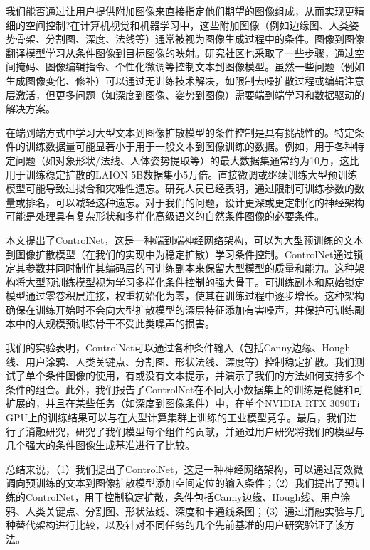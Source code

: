 \documentclass[a4paper,AutoFakeBold,oneside,12pt]{book}
\begin{document}
\begin{nopagenumber}
我们能否通过让用户提供附加图像来直接指定他们期望的图像组成，从而实现更精细的空间控制?在计算机视觉和机器学习中，这些附加图像（例如边缘图、人类姿势骨架、分割图、深度、法线等）通常被视为图像生成过程中的条件。图像到图像翻译模型学习从条件图像到目标图像的映射。研究社区也采取了一些步骤，通过空间掩码、图像编辑指令、个性化微调等控制文本到图像模型。虽然一些问题（例如生成图像变化、修补）可以通过无训练技术解决，如限制去噪扩散过程或编辑注意层激活，但更多问题（如深度到图像、姿势到图像）需要端到端学习和数据驱动的解决方案。

在端到端方式中学习大型文本到图像扩散模型的条件控制是具有挑战性的。特定条件的训练数据量可能显著小于用于一般文本到图像训练的数据。例如，用于各种特定问题（如对象形状/法线、人体姿势提取等）的最大数据集通常约为10万，这比用于训练稳定扩散的LAION-5B数据集小5万倍。直接微调或继续训练大型预训练模型可能导致过拟合和灾难性遗忘。研究人员已经表明，通过限制可训练参数的数量或排名，可以减轻这种遗忘。对于我们的问题，设计更深或更定制化的神经架构可能是处理具有复杂形状和多样化高级语义的自然条件图像的必要条件。

本文提出了ControlNet，这是一种端到端神经网络架构，可以为大型预训练的文本到图像扩散模型（在我们的实现中为稳定扩散）学习条件控制。ControlNet通过锁定其参数并同时制作其编码层的可训练副本来保留大型模型的质量和能力。这种架构将大型预训练模型视为学习多样化条件控制的强大骨干。可训练副本和原始锁定模型通过零卷积层连接，权重初始化为零，使其在训练过程中逐步增长。这种架构确保在训练开始时不会向大型扩散模型的深层特征添加有害噪声，并保护可训练副本中的大规模预训练骨干不受此类噪声的损害。

我们的实验表明，ControlNet可以通过各种条件输入（包括Canny边缘、Hough线、用户涂鸦、人类关键点、分割图、形状法线、深度等）控制稳定扩散。我们测试了单个条件图像的使用，有或没有文本提示，并演示了我们的方法如何支持多个条件的组合。此外，我们报告了ControlNet在不同大小数据集上的训练是稳健和可扩展的，并且在某些任务（如深度到图像条件）中，在单个NVIDIA RTX 3090Ti GPU上的训练结果可以与在大型计算集群上训练的工业模型竞争。最后，我们进行了消融研究，研究了我们模型每个组件的贡献，并通过用户研究将我们的模型与几个强大的条件图像生成基准进行了比较。

总结来说，（1）我们提出了ControlNet，这是一种神经网络架构，可以通过高效微调向预训练的文本到图像扩散模型添加空间定位的输入条件；（2）我们提出了预训练的ControlNet，用于控制稳定扩散，条件包括Canny边缘、Hough线、用户涂鸦、人类关键点、分割图、形状法线、深度和卡通线条图；（3）通过消融实验与几种替代架构进行比较，以及针对不同任务的几个先前基准的用户研究验证了该方法。

\newpage


\end{nopagenumber}
\end{document}

